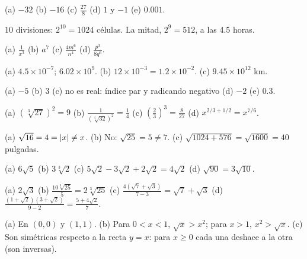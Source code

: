 \documentclass[11pt,a4paper]{article}
\begin{document}
\respuestas
\begin{respuestascortas}
\begin{soluciones}
\item (a) $-32$ (b) $-16$ (c) $\tfrac{27}{8}$ (d) $1$ y $-1$ (e) $0.001$.
\item $10$ divisiones: $2^{10}=1024$ células. La mitad, $2^{9}=512$, a las $4.5$ horas.
\item (a) $\tfrac1{x^{3}}$ (b) $a^{7}$ (c) $\tfrac{4m^{6}}{n^{4}}$ (d) $\tfrac{p^{3}}{8q^{6}}$.
\item (a) $4.5\times10^{-7}$; $6.02\times10^{9}$. (b) $12\times10^{-3}=1.2\times10^{-2}$.
      (c) $9.45\times10^{12}$ km.
\item (a) $-5$ (b) $3$ (c) no es real: índice par y radicando negativo (d) $-2$ (e) $0.3$.
\item (a) $(\sqrt[3]{27})^2=9$ (b) $\tfrac1{(\sqrt[5]{32})^2}=\tfrac14$ (c) $\left(\tfrac23\right)^3=\tfrac8{27}$
      (d) $x^{2/3+1/2}=x^{7/6}$.
\item (a) $\sqrt{16}=4=\left\lvert x\right\rvert\neq x$. (b) No: $\sqrt{25}=5\neq7$. (c) $\sqrt{1024+576}=\sqrt{1600}=40$ pulgadas.
\item (a) $6\sqrt5$ (b) $3\sqrt[3]{2}$ (c) $5\sqrt2-3\sqrt2+2\sqrt2=4\sqrt2$ (d) $\sqrt{90}=3\sqrt{10}$.
\item (a) $2\sqrt3$ (b) $\tfrac{10\sqrt[3]{25}}{5}=2\sqrt[3]{25}$ (c) $\tfrac{4(\sqrt7+\sqrt3)}{7-3}=\sqrt7+\sqrt3$
      (d) $\tfrac{(1+\sqrt2)(3+\sqrt2)}{9-2}=\tfrac{5+4\sqrt2}{7}$.
\item (a) En $(0,0)$ y $(1,1)$. (b) Para $0<x<1$, $\sqrt x>x^{2}$; para $x>1$, $x^{2}>\sqrt x$. (c) Son simétricas
      respecto a la recta $y=x$: para $x\ge0$ cada una deshace a la otra (son inversas).
\end{soluciones}
\end{respuestascortas}
\end{document}

